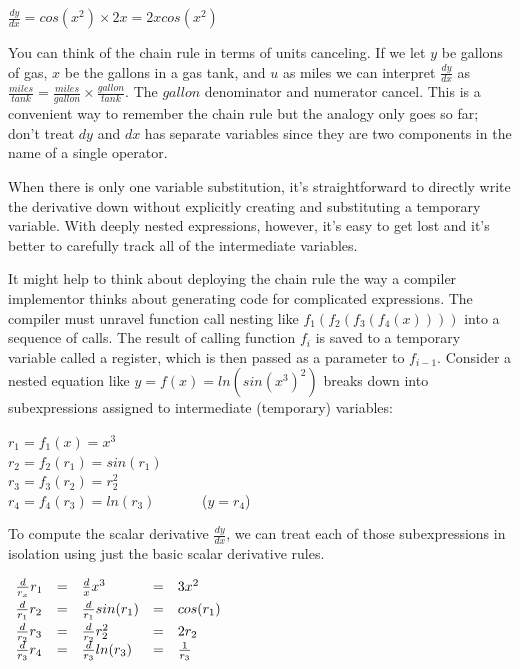 \documentclass[11pt]{article}
\begin{document}
$\frac{dy}{dx} = cos(x^2) \times 2x = 2xcos(x^2)$

You can think of the chain rule in terms of units canceling. If we let $y$ be gallons of gas, $x$ be the gallons in a gas tank, and $u$ as miles we can interpret $\frac{dy}{dx}$ as $\frac{miles}{tank} = \frac{miles}{gallon} \times \frac{gallon}{tank}$. The $gallon$ denominator and numerator cancel. This is a convenient way to remember the chain rule but the analogy only goes so far; don't treat $dy$ and $dx$ has separate variables since they are two components in the name of a single operator.

When there is only one variable substitution, it's straightforward to directly write the derivative down without explicitly creating and substituting a temporary variable. With deeply nested expressions, however, it's easy to get lost and it's better to carefully track all of the intermediate variables.

It might help to think about deploying the chain rule the way a compiler implementor thinks about generating code for complicated expressions.  The compiler must unravel function call nesting like $f_1(f_2(f_3(f_4(x))))$ into a sequence of calls. The result of calling function $f_i$ is saved to a temporary variable called a register, which is then passed as a parameter to $f_{i-1}$.  Consider a nested equation like $y = f(x) = ln(sin(x^3)^2)$ breaks down into subexpressions assigned to  intermediate (temporary) variables:

$r_1 = f_1(x) = x^3$\\
$r_2 = f_2(r_1) = sin(r_1)$\\
$r_3 = f_3(r_2) = r_2^2$\\
$r_4 = f_4(r_3) = ln(r_3)$ ~~~~~~($y = r_4$)

To compute the scalar derivative $\frac{dy}{dx}$, we can treat each of those subexpressions in isolation using just the basic scalar derivative rules.

$
\begin{array}{lllll}
\vspace{1mm}
\frac{d}{r_x} r_1 & = & \frac{d}{x} x^3 & = & 3x^2\\
\vspace{1mm}
\frac{d}{r_1} r_2 & = & \frac{d}{r_1} sin(r_1) & = & cos(r_1) \\
\frac{d}{r_2} r_3 & = & \frac{d}{r_2} r_2^2 & =& 2r_2\\
\frac{d}{r_3} r_4 & = & \frac{d}{r_3} ln(r_3) & =& \frac{1}{r_3}\\
\end{array}
$
\end{document}
